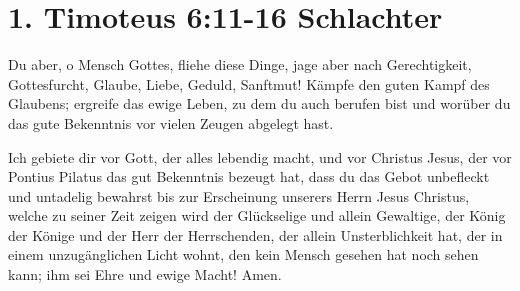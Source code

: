\documentclass[12pt]{../../inc/mybib}
\author{Lothar Schmid}
\begin{document}
\section{1. Timoteus 6:11-16 \small{Schlachter}}
Du aber, o Mensch Gottes, fliehe diese Dinge, jage aber nach Gerechtigkeit,
Gottesfurcht, Glaube, Liebe, Geduld, Sanftmut! Kämpfe den guten Kampf des Glaubens; ergreife das ewige Leben, zu dem du auch berufen bist und worüber du das gute Bekenntnis vor vielen Zeugen abgelegt hast.

Ich gebiete dir vor Gott, der alles lebendig macht, und vor Christus Jesus, der vor Pontius Pilatus das gut Bekenntnis bezeugt hat, dass du das Gebot unbefleckt und untadelig bewahrst bis zur Erscheinung unserers Herrn Jesus Christus, welche zu seiner Zeit zeigen wird der Glückselige und allein Gewaltige, der König der Könige und der Herr der Herrschenden, der allein Unsterblichkeit hat, der in einem unzugänglichen Licht wohnt, den kein Mensch gesehen hat noch sehen kann; ihm sei Ehre und ewige Macht! Amen.
\end{document}

